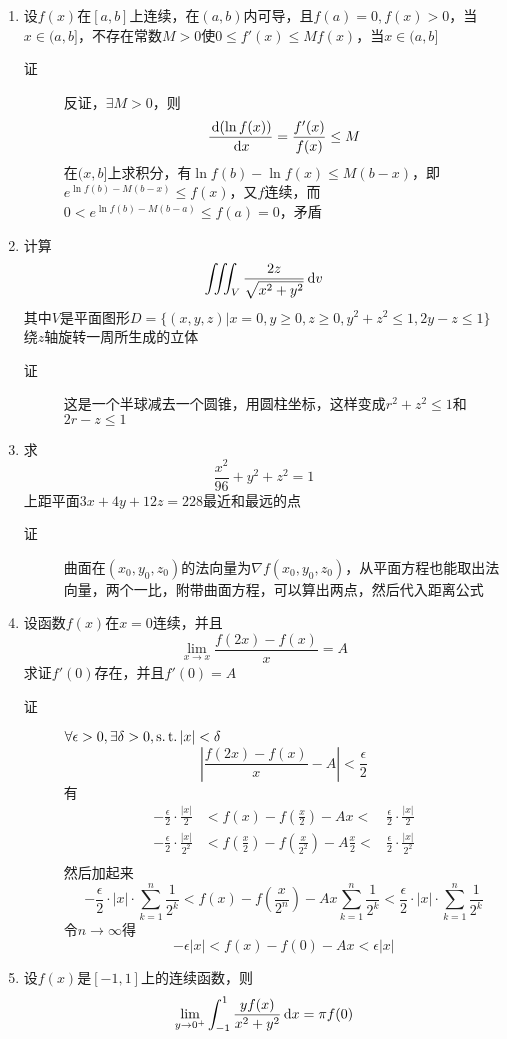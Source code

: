 \begin{enumerate}
\item 设$f(x)$在$[a,b]$上连续，在$(a,b)$内可导，且$f(a)=0,f(x)>0$，当$x\in(a,b]$，不存在常数$M>0$使$0\leq f'(x)\leq Mf(x)$，当$x\in(a,b]$
\begin{description}
\item[证] 反证，$\exists M>0$，则
\[
\frac{\,\mathrm{d}(\ln f(x))}{\,\mathrm{d} x}=\frac{f'(x)}{f(x)}\leq M
\]
在$(x,b]$上求积分，有$\ln f(b)-\ln f(x)\leq M(b-x)$，即$e^{\ln f(b)-M(b-x)}\leq f(x)$，又$f$连续，而$0<e^{\ln f(b)-M(b-a)}\leq f(a)=0$，矛盾
\end{description}

\item 计算
\[
\iiint_V \frac{2z}{\sqrt{x^2+y^2}}\,\mathrm{d} v
\]
其中$V$是平面图形$D=\{(x,y,z)|x=0,y\geq 0,z\geq 0,y^2+z^2\leq 1,2y-z\leq 1\}$绕$z$轴旋转一周所生成的立体
\begin{description}
\item[证] 这是一个半球减去一个圆锥，用圆柱坐标，这样变成$r^2+z^2\leq 1$和$2r-z\leq 1$
\end{description}

\item 求
\[
\frac{x^2}{96}+y^2+z^2=1
\]
上距平面$3x+4y+12z=228$最近和最远的点
\begin{description}
\item[证] 曲面在$(x_0,y_0,z_0)$的法向量为$\nabla f(x_0,y_0,z_0)$，从平面方程也能取出法向量，两个一比，附带曲面方程，可以算出两点，然后代入距离公式
\end{description}

\item 设函数$f(x)$在$x=0$连续，并且
\[
\lim_{x\to x}\frac{f(2x)-f(x)}{x}=A
\]
求证$f'(0)$存在，并且$f'(0)=A$
\begin{description}
\item[证] $\forall \epsilon>0,\exists \delta>0,\operatorname{s.t.} |x|<\delta$
\[
\left|\frac{f(2x)-f(x)}{x}-A\right|<\frac{\epsilon}{2}
\]
有
\begin{eqnarray*}
-\frac{\epsilon}{2}\cdot\frac{|x|}{2} &<f(x)-f(\frac{x}{2})-Ax<&\frac{\epsilon}{2}\cdot\frac{|x|}{2}\\
-\frac{\epsilon}{2}\cdot\frac{|x|}{2^2} &<f(\frac{x}{2})-f(\frac{x}{2^2})-A\frac{x}{2}<&\frac{\epsilon}{2}\cdot\frac{|x|}{2^2}\\
\end{eqnarray*}
然后加起来
\[
-\frac{\epsilon}{2}\cdot|x|\cdot\sum_{k=1}^n\frac{1}{2^k} <f(x)-f(\frac{x}{2^n})-Ax\sum_{k=1}^n\frac{1}{2^k}<\frac{\epsilon}{2}\cdot|x|\cdot\sum_{k=1}^n\frac{1}{2^k}
\]
令$n\to \infty$得
\[
-\epsilon|x|<f(x)-f(0)-Ax<\epsilon|x|
\]
\end{description}


\item 设$f(x)$是$[-1,1]$上的连续函数，则
\[
\lim_{y \to 0^+} \int_{-1}^1 \frac{yf(x)}{x^2+y^2}\,\mathrm{d} x=\pi f(0)
\]





















\end{enumerate}